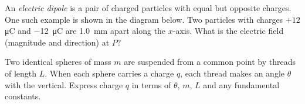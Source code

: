 \documentclass{../../ossphysics}
\begin{document}
\begin{questions}
  
  \question An \emph{electric dipole} is a pair of charged particles with equal
  but opposite charges. One such example is shown in the diagram below.
  Two particles with charges $+12$ \si{\micro\coulomb} and
  \SI{-12}{\micro\coulomb} are \SI{1.0}{\milli\metre} apart along the $x$-axis.
  What is the electric field (magnitude and direction) at $P$?
  
  \vspace{\stretch1}

  \question Two identical spheres of mass $m$ are suspended from a common point
  by threads of length $L$. When each sphere carries a charge $q$, each thread
  makes an angle $\theta$ with the vertical. Express charge $q$ in terms of
  $\theta$, $m$, $L$ and any fundamental constants.


\end{questions}
\end{document}

